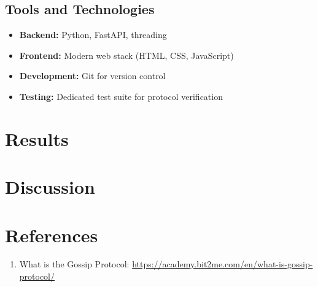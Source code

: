 \documentclass[a4paper,12pt]{article}
\begin{document}
\subsection{Tools and Technologies}
\begin{itemize}
    \item \textbf{Backend:} Python, FastAPI, threading
    \item \textbf{Frontend:} Modern web stack (HTML, CSS, JavaScript)
    \item \textbf{Development:} Git for version control
    \item \textbf{Testing:} Dedicated test suite for protocol verification
\end{itemize}

\section{Results}

\section{Discussion}

\section{References}

\begin{enumerate}
    \item What is the Gossip Protocol: \url{https://academy.bit2me.com/en/what-is-gossip-protocol/}
\end{enumerate}
\end{document}
